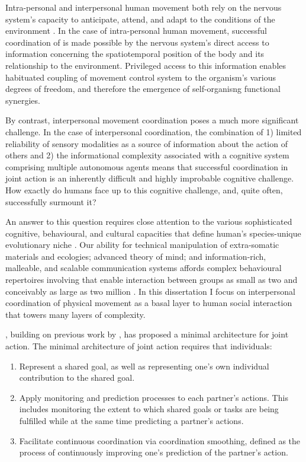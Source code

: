 \begin{CJK}{UTF8}{gbsn}
Intra-personal and interpersonal human movement both rely on the nervous system’s capacity to anticipate, attend, and adapt to the conditions of the environment \citep{Keller2014}.  In the case of intra-personal human movement, successful coordination of is made possible by the nervous system's direct access to information concerning the spatiotemporal position of the body and its relationship to the environment.  Privileged access to this information enables habituated coupling of movement control system to the organism's various degrees of freedom, and therefore the emergence of self-organisng functional synergies.

By contrast, interpersonal movement coordination poses a much more significant challenge.  In the case of interpersonal coordination, the combination of 1) limited reliability of sensory modalities as a source of information about the action of others \citep{Wilson2005,Wolpert2003,Frith2007} and 2) the informational complexity associated with a cognitive system comprising multiple autonomous agents \citep{Bernstein1967} means that successful coordination in joint action is an inherently difficult and highly improbable cognitive challenge.  How exactly do humans face up to this cognitive challenge, and, quite often, successfully surmount it?

An answer to this question requires close attention to the various sophisticated cognitive, behavioural, and cultural capacities that define human's species-unique evolutionary niche \citep{Roepstorff2010,Clark2015,Fuentes2016}. Our ability for technical manipulation of extra-somatic materials and ecologies; advanced theory of mind; and information-rich, malleable, and scalable communication systems affords complex behavioural repertoires involving that enable interaction between groups as small as two and conceivably as large as two million \citep{Nowak2017}.  In this dissertation I focus on interpersonal coordination of physical movement as a basal layer to human social interaction that towers many layers of complexity.

\textcite{Vesper2010}, building on previous work by  \textcite{Sebanz2006}, has proposed a minimal architecture for joint action.  The minimal architecture of joint action requires that individuals:

\begin{enumerate}
  \item Represent a shared goal, as well as representing one’s own individual contribution to the shared goal.
  \item Apply monitoring and prediction processes to each partner’s actions. This includes monitoring the extent to which shared goals or tasks are being fulfilled while at the same time predicting a partner’s actions.
  \item Facilitate continuous coordination via coordination smoothing, defined as the process of continuously improving one’s prediction of the partner’s action.
\end{enumerate}


\end{CJK}
